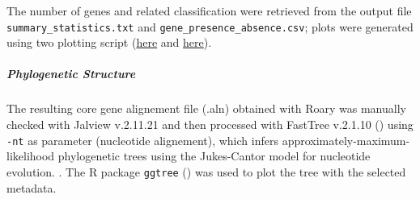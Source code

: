 The number of genes and related classification were retrieved from the output file
\texttt{summary\_statistics.txt} and \texttt{gene\_presence\_absence.csv}; plots were generated using two
plotting script (\href{https://github.com/sanger-pathogens/Roary/blob/master/bin/create_pan_genome_plots.R}{here}
and \href{https://github.com/sanger-pathogens/Roary/blob/master/contrib/roary_plots/roary_plots.py}{here}).


\subparagraph*{Phylogenetic Structure}

The resulting core gene alignement file (.aln) obtained with Roary was manually checked with
Jalview v.2.11.21 and then processed with FastTree v.2.1.10 (\cite{fasttree})
using \texttt{-nt} as parameter (nucleotide alignement), which infers approximately-maximum-likelihood phylogenetic trees using the Jukes-Cantor model for nucleotide evolution.
. The R package \texttt{ggtree} (\cite{ggtree1, ggtree2, ggtree3}) was used to plot
the tree with the selected metadata.





